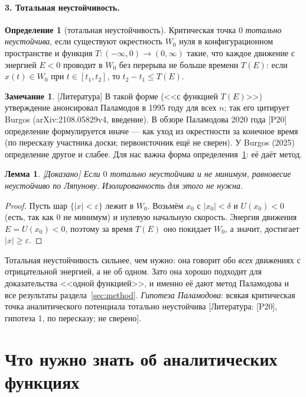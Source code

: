 \documentclass[11pt,a4paper]{article}
\newtheorem{lemma}[theorem]{Лемма}
\theoremstyle{definition}
\newtheorem{definition}[theorem]{Определение}
\newtheorem{remark}[theorem]{Замечание}
\newcommand{\eps}{\varepsilon}
\newcommand{\mk}[1]{\textsf{[#1]}}
\newcommand{\term}[1]{\emph{#1}}
\begin{document}
\paragraph{3. Тотальная неустойчивость.}

\begin{definition}[тотальная неустойчивость]\label{def:total}
Критическая точка $0$ \term{тотально неустойчива}, если существуют окрестность $W_0$ нуля в
конфигурационном пространстве и функция $T\colon(-\infty,0)\to(0,\infty)$ такие, что каждое
движение с энергией $E<0$ проводит в $W_0$ без перерыва не больше времени $T(E)$: если
$x(t)\in W_0$ при $t\in[t_1,t_2]$, то $t_2-t_1\le T(E)$.
\end{definition}

\begin{remark}
\mk{Литература} В такой форме (<<с функцией $T(E)$>>) утверждение анонсировал Паламодов в 1995
году для всех $n$; так его цитирует Burgos (arXiv:2108.05829v4, введение). В обзоре Паламодова
2020 года [P20] определение формулируется иначе --- как уход из окрестности за конечное время
(по пересказу участника доски; первоисточник ещё не сверен). У Burgos (2025) определение другое
и слабее. Для нас важна форма определения~\ref{def:total}: её даёт метод.
\end{remark}

\begin{lemma}\label{lem:total-lyap}
\mk{Доказано} Если $0$ тотально неустойчива и не минимум, равновесие неустойчиво по Ляпунову.
Изолированность для этого не нужна.
\end{lemma}
\begin{proof}
Пусть шар $\{|x|<\eps\}$ лежит в $W_0$. Возьмём $x_0$ с $|x_0|<\delta$ и $U(x_0)<0$ (есть, так
как $0$ не минимум) и нулевую начальную скорость. Энергия движения $E=U(x_0)<0$, поэтому за
время $T(E)$ оно покидает $W_0$, а значит, достигает $|x|\ge\eps$.
\end{proof}

Тотальная неустойчивость сильнее, чем нужно: она говорит обо \emph{всех} движениях с
отрицательной энергией, а не об одном. Зато она хорошо подходит для доказательства <<одной
функцией>>, и именно её дают метод Паламодова и все результаты раздела~\ref{sec:method}.
\emph{Гипотеза Паламодова}: всякая критическая точка аналитического потенциала тотально
неустойчива \mk{Литература: [P20], гипотеза 1, по пересказу; не сверено}.

\section{Что нужно знать об аналитических функциях}\label{sec:analytic}
\end{document}
